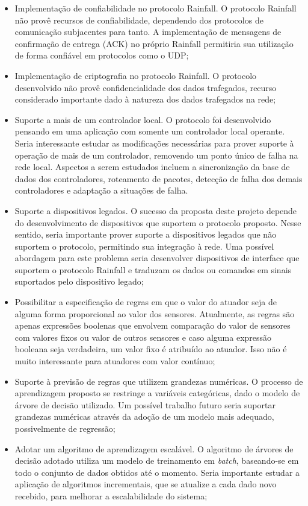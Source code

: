 \begin{itemize}
	\item Implementação de confiabilidade no protocolo Rainfall. O protocolo Rainfall não provê recursos de confiabilidade, dependendo dos protocolos de comunicação subjacentes para tanto. A implementação de mensagens de confirmação de entrega (ACK) no próprio Rainfall permitiria sua utilização de forma confiável em protocolos como o UDP;
	\item Implementação de criptografia no protocolo Rainfall. O protocolo desenvolvido não provê confidencialidade dos dados trafegados, recurso considerado importante dado à natureza dos dados trafegados na rede;
	\item Suporte a mais de um controlador local. O protocolo foi desenvolvido pensando em uma aplicação com somente um controlador local operante. Seria interessante estudar as modificações necessárias para prover suporte à operação de mais de um controlador, removendo um ponto único de falha na rede local. Aspectos a serem estudados incluem a sincronização da base de dados dos controladores, roteamento de pacotes, detecção de falha dos demais controladores e adaptação a situações de falha.
	\item Suporte a dispositivos legados. O sucesso da proposta deste projeto depende do desenvolvimento de dispositivos que suportem o protocolo proposto. Nesse sentido, seria importante prover suporte a dispositivos legados que não suportem o protocolo, permitindo sua integração à rede. Uma possível abordagem para este problema seria desenvolver dispositivos de interface que suportem o protocolo Rainfall e traduzam os dados ou comandos em sinais suportados pelo dispositivo legado;	
	\item Possibilitar a especificação de regras em que o valor do atuador seja de alguma forma proporcional ao valor dos sensores. Atualmente, as regras são apenas expressões boolenas que envolvem comparação do valor de sensores com valores fixos ou valor de outros sensores e caso alguma expressão booleana seja verdadeira, um valor fixo é atribuído ao atuador. Isso não é muito interessante para atuadores com valor contínuo;
	\item Suporte à previsão de regras que utilizem grandezas numéricas. O processo de aprendizagem proposto se restringe a variáveis categóricas, dado o modelo de árvore de decisão utilizado. Um possível trabalho futuro seria suportar grandezas numéricas através da adoção de um modelo mais adequado, possivelmente de regressão;
	\item Adotar um algoritmo de aprendizagem escalável. O algoritmo de árvores de decisão adotado utiliza um modelo de treinamento em \textit{batch}, baseando-se em todo o conjunto de dados obtidos até o momento. Seria importante estudar a aplicação de algoritmos incrementais, que se atualize a cada dado novo recebido, para melhorar a escalabilidade do sistema;

\end{itemize}
